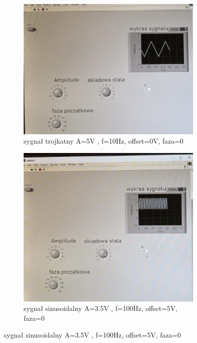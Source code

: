 \documentclass[11pt]{article}
\begin{document}
\begin{figure}[H]
  \centering
  \begin{subfigure}{.48\textwidth}
    \centering
    \includegraphics[width=\linewidth]{img/obraz2.jpg}
    \caption{sygnał trojkatny A=5V , f=10Hz, offset=0V, faza=0\degree}
    \label{fig:sub1}
  \end{subfigure}\hfill
  \begin{subfigure}{.48\textwidth}
    \centering
    \includegraphics[width=\linewidth]{img/obraz3.jpg}
    \caption{sygnał sinusoidalny A=3.5V , f=100Hz, offset=5V, faza=0\degree}

\end{subfigure}
\end{figure}
\end{document}
